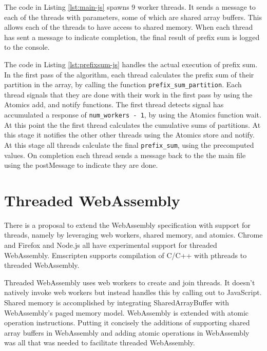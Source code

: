 \documentclass[11pt]{book}
\begin{document}
The code in Listing \ref{lst:main-js} spawns 9 worker threads. It sends a message to each of the threads with parameters, some of which are shared array buffers. This allows each of the threads to have access to shared memory. When each thread has sent a message to indicate completion, the final result of prefix sum is logged to the console.



The code in Listing \ref{lst:prefixsum-js} handles the actual execution of prefix sum. In the first pass of the algorithm, each thread calculates the prefix sum of their partition in the array, by calling the function \texttt{prefix\_sum\_partition}. Each thread signals that they are done with their work in the first pass by using the Atomics add, and notify functions. The first thread detects signal has accumulated a response of \texttt{num\_workers - 1}, by using the Atomics function wait. At this point the the first thread calculates the cumulative sums of partitions. At this stage it notifies the other other threads using the Atomics store and notify. At this stage all threads calculate the final \texttt{prefix\_sum}, using the precomputed values. On completion each thread sends a message back to the the main file using the postMessage to indicate they are done. 




\section{Threaded WebAssembly}
There is a proposal to extend the WebAssembly specification with support for threads, namely by leveraging web workers, shared memory, and atomics. Chrome and Firefox and Node.js all have experimental support for threaded WebAssembly. Emscripten supports compilation of C/C++ with pthreads to threaded WebAssembly.

Threaded WebAssembly uses web workers to create and join threads. It doesn't natively invoke web workers but instead handles this by calling out to JavaScript. Shared memory is accomplished by integrating SharedArrayBuffer with WebAssembly's paged memory model. WebAssembly is extended with atomic operation instructions. Putting it concisely the additions of supporting shared array buffers in WebAssembly and adding atomic operations in WebAssembly was all that was needed to facilitate threaded WebAssembly.
\end{document}
